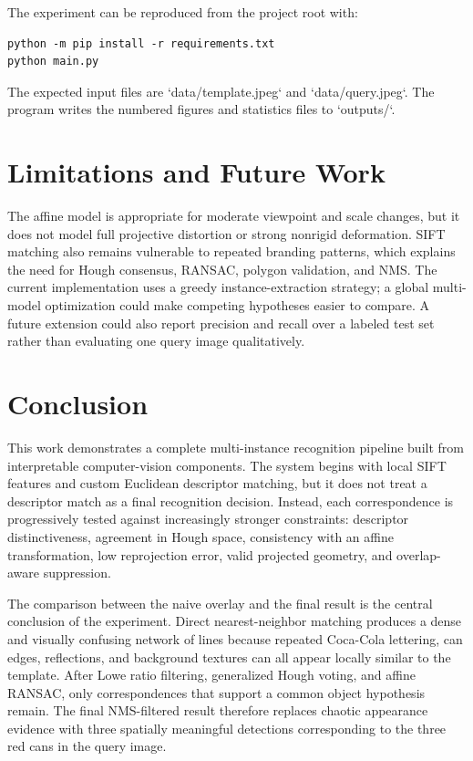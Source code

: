 \documentclass[10pt,twocolumn]{article}
\begin{document}
The experiment can be reproduced from the project root with:
\begin{lstlisting}
python -m pip install -r requirements.txt
python main.py
\end{lstlisting}
The expected input files are `data/template.jpeg` and `data/query.jpeg`. The program writes the numbered figures and statistics files to `outputs/`.

\section{Limitations and Future Work}
The affine model is appropriate for moderate viewpoint and scale changes, but it does not model full projective distortion or strong nonrigid deformation. SIFT matching also remains vulnerable to repeated branding patterns, which explains the need for Hough consensus, RANSAC, polygon validation, and NMS. The current implementation uses a greedy instance-extraction strategy; a global multi-model optimization could make competing hypotheses easier to compare. A future extension could also report precision and recall over a labeled test set rather than evaluating one query image qualitatively.

\section{Conclusion}
This work demonstrates a complete multi-instance recognition pipeline built from interpretable computer-vision components. The system begins with local SIFT features and custom Euclidean descriptor matching, but it does not treat a descriptor match as a final recognition decision. Instead, each correspondence is progressively tested against increasingly stronger constraints: descriptor distinctiveness, agreement in Hough space, consistency with an affine transformation, low reprojection error, valid projected geometry, and overlap-aware suppression.

The comparison between the naive overlay and the final result is the central conclusion of the experiment. Direct nearest-neighbor matching produces a dense and visually confusing network of lines because repeated Coca-Cola lettering, can edges, reflections, and background textures can all appear locally similar to the template. After Lowe ratio filtering, generalized Hough voting, and affine RANSAC, only correspondences that support a common object hypothesis remain. The final NMS-filtered result therefore replaces chaotic appearance evidence with three spatially meaningful detections corresponding to the three red cans in the query image.
\end{document}
